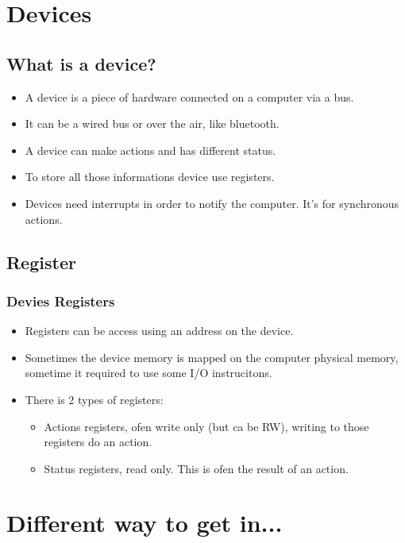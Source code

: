 \section{Devices}

\subsection{What is a device?}
\begin{frame}
\begin{itemize}
  \item A device is a piece of hardware connected on a computer via a
        bus.
  \item It can be a wired bus or over the air, like bluetooth.
  \item A device can make actions and has different status.
  \item To store all those informations device use registers.
  \item Devices need interrupts in order to notify the computer. It's
  for synchronous actions.
\end{itemize}
\end{frame}
\subsection{Register}
\begin{frame}
\frametitle{Devies Registers}
\begin{itemize}
        \item Registers can be access using an address on the device.
        \item Sometimes the device memory is mapped on the computer
        physical memory, sometime it required to use some I/O
        instrucitons.
        \item There is 2 types of registers:
        \begin{itemize}
          \item Actions registers, ofen write only (but ca be RW),
          writing to those registers do an action.
          \item Status registers, read only. This is ofen the result of
          an action.
        \end{itemize}
\end{itemize}
\end{frame}


\section{Different way to get in...}
